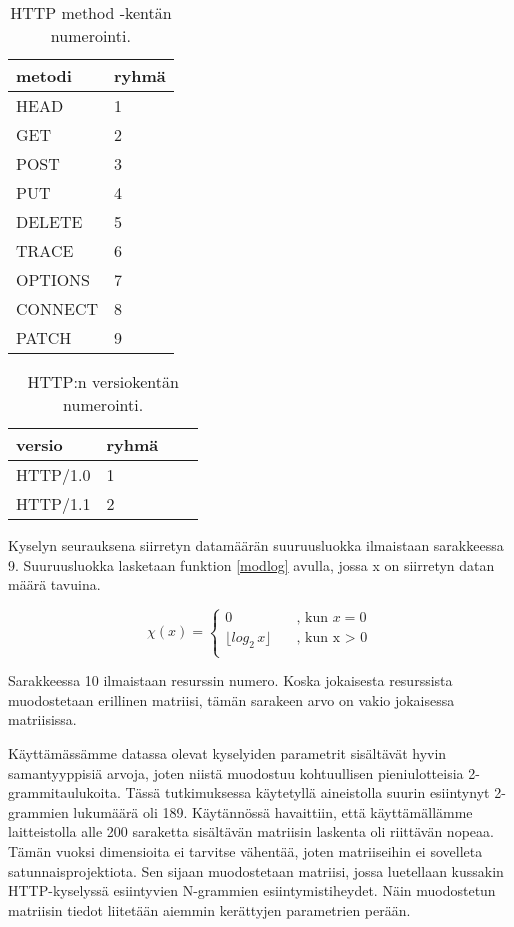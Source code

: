 \begin{table}[p]
\centering
\begin{tabular}{ll}
metodi & ryhmä \\
\hline
HEAD & 1 \\
GET & 2 \\
POST & 3 \\
PUT & 4 \\
DELETE & 5 \\
TRACE & 6 \\
OPTIONS & 7 \\
CONNECT & 8 \\
PATCH & 9 \\

\end{tabular}
\caption{HTTP method -kentän numerointi.}
\label{metodi}
\end{table}

\begin{table}[p]
\centering
\begin{tabular}{llll}
versio & ryhmä \\
\hline
HTTP/1.0 & 1 \\
HTTP/1.1 & 2 \\
\end{tabular}
\caption{ HTTP:n versiokentän numerointi.}
\label{httpversio}
\end{table}

Kyselyn seurauksena siirretyn datamäärän suuruusluokka ilmaistaan
sarakkeessa 9. Suuruusluokka lasketaan funktion \ref{modlog} avulla, jossa x
on siirretyn datan määrä tavuina.

\begin{equation} \label{modlog}
  \chi(x) = \left\{
  \begin{array}{ll}
    0 & \quad \text{, kun $x = 0$}\\
    \lfloor log_2 \, x \rfloor & \quad \text{, kun x > 0}\\
  \end{array} \right.
\end{equation}

\vskip 0.5cm
Sarakkeessa 10 ilmaistaan resurssin numero. Koska jokaisesta
resurssista muodostetaan erillinen matriisi, tämän sarakeen arvo on
vakio jokaisessa matriisissa.


Käyttämässämme datassa olevat kyselyiden parametrit sisältävät hyvin
samantyyppisiä arvoja, joten niistä muodostuu kohtuullisen
pieniulotteisia 2-\-grammitaulukoita. Tässä tutkimuksessa käytetyllä
aineistolla suurin esiintynyt 2-grammien lukumäärä oli
189. Käytännössä havaittiin, että käyttämällämme laitteistolla alle
200 saraketta sisältävän matriisin laskenta oli riittävän
nopeaa. Tämän vuoksi dimensioita ei tarvitse vähentää, joten matriiseihin ei sovelleta
satunnaisprojektiota. Sen sijaan muodostetaan matriisi, jossa
luetellaan kussakin HTTP-kyselyssä esiintyvien N-grammien
esiintymistiheydet. Näin muodostetun matriisin tiedot liitetään
aiemmin kerättyjen parametrien perään.

